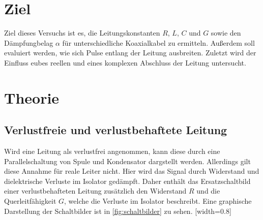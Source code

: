 \section{Ziel}
\label{sec:Ziel}
Ziel dieses Versuchs ist es, die Leitungskonstanten $R$, $L$, $C$ und $G$ sowie den Dämpfungbelag $\alpha$ für unterschiedliche Koaxialkabel zu ermitteln. Außerdem soll evaluiert werden, wie sich Pulse entlang der Leitung ausbreiten. Zuletzt wird der Einfluss eubes reellen und eines komplexen Abschluss der Leitung untersucht.

\section{Theorie}
\label{sec:theorie}
\subsection{Verlustfreie und verlustbehaftete Leitung}
Wird eine Leitung als verlustfrei angenommen, kann diese durch eine Parallelschaltung von Spule und Kondensator dargstellt werden. Allerdings gilt diese Annahme für reale Leiter nicht. Hier wird das Signal durch Widerstand und dielektrische Verluste im Isolator gedämpft. Daher enthält das Ersatzschaltbild einer verlustbehafteten Leitung zusätzlich den Widerstand $R$ und die Querleitfähigkeit $G$, welche die Verluste im Isolator beschreibt. Eine graphische Darstellung der Schaltbilder ist in \autoref{fig:schaltbilder} zu sehen.
[width=0.8\textwidth]

